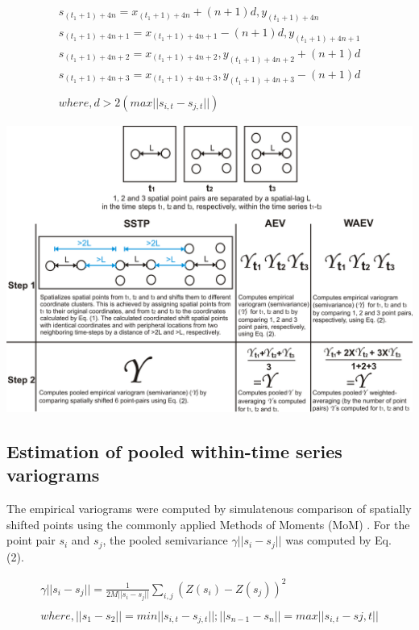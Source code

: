 \documentclass[a0,portrait]{a0poster}
\begin{document}
\begin{multicols}{2}
\begin{equation}
\begin{split}
s_{(t_1+1)+4n} = x_{(t_1+1)+4n}+(n+1)d, y_{(t_1+1)+4n} \\
s_{(t_1+1)+4n+1} = x_{(t_1+1)+4n+1}-(n+1)d, y_{(t_1+1)+4n+1} \\
s_{(t_1+1)+4n+2} = x_{(t_1+1)+4n+2}, y_{(t_1+1)+4n+2}+(n+1)d \\
s_{(t_1+1)+4n+3} = x_{(t_1+1)+4n+3}, y_{(t_1+1)+4n+3}-(n+1)d \\ \\
where, d>2(max||s_{i,t}-s_{j,t}||)
\end{split}
\end{equation}

\begin{center}
\includegraphics[width=1\linewidth]{Fig_1}
\end{center}

\subsection*{Estimation of pooled within-time series variograms}

The empirical variograms were computed by simulatenous comparison of spatially shifted points using the commonly applied Methods of Moments (MoM) \cite{webster_geostatistics_2007}. For the point pair $s_i$ and $s_j$, the pooled semivariance $\gamma ||s_i-s_j||$ was computed by Eq. (2).

\begin{equation}
\begin{split}
\gamma ||s_i-s_j||=\frac{1}{2M||s_i-s_j||}\sum_{i,j}(Z(s_i)-Z(s_j))^2 \\ \\
where, ||s_1-s_2||=min||s_{i,t}-s_{j,t}||; ||s_{n-1}-s_n||=max||s_{i,t}-s{j,t}||
\end{split}
\end{equation}


\end{multicols}
\end{document}
